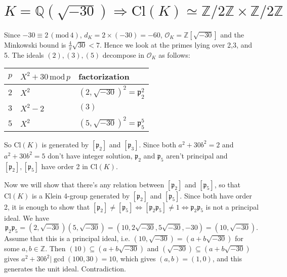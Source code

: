 \documentclass{article}
\newcommand{\Cl}{\mathrm{Cl}}
\newcommand{\Mod}[1]{\,(\mathrm{mod}\,#1)}
\begin{document}
\section{$K = \mathbb{Q}(\sqrt{-30}) \Rightarrow \Cl(K) \simeq \mathbb{Z}/2\mathbb{Z}\times\mathbb{Z}/2\mathbb{Z}$}
Since $-30\equiv 2\Mod{4}$, $d_{K} = 2\times (-30) = -60$, $\mathcal{O}_{K} = \mathbb{Z}[\sqrt{-30}]$ and the Minkowski bound is $\frac{4}{\pi}\sqrt{30} < 7$. Hence we look at the primes lying over 2,3, and 5. The ideals $(2), (3), (5)$ decompose in $\mathcal{O}_{K}$ as follows:
\begin{center}
\begin{tabular}{|l|l|l|}
\hline
$p$ & $X^{2} + 30 \,\mathrm{mod}\, p$ & factorization        \\ \hline
2   & $X^{2}$                         & $(2,\sqrt{-30})^{2} = \mathfrak{p}_{2}^{2}$ \\ \hline
3   & $X^2 - 2$                       & $(3)$                \\ \hline
5   & $X^{2}$                         & $(5,\sqrt{-30})^{2} = \mathfrak{p}_{5}^{5}$ \\ \hline
\end{tabular}
\end{center}
So $\Cl(K)$ is generated by $[\mathfrak{p}_{2}]$ and $[\mathfrak{p}_{3}]$. Since both $a^{2} + 30b^{2} = 2$ and $a^{2}+30b^{2} = 5$ don't have integer solution, $\mathfrak{p}_{2}$ and $\mathfrak{p}_{5}$ aren't principal and $[\mathfrak{p}_{2}],[\mathfrak{p}_{5}]$ have order 2 in $\Cl(K)$. 

Now we will show that there's any relation between $[\mathfrak{p}_{2}]$ and $[\mathfrak{p}_{5}]$, so that $\Cl(K)$ is a Klein 4-group generated by $[\mathfrak{p}_{2}]$ and $[\mathfrak{p}_{5}]$. Since both have order 2, it is enough to show that $[\mathfrak{p}_{2}]\neq [\mathfrak{p}_{5}] \Leftrightarrow [\mathfrak{p}_{2}\mathfrak{p}_{5}] \neq 1 \Leftrightarrow \mathfrak{p}_{2}\mathfrak{p}_{5}$ is not a principal ideal. 
We have
$$
\mathfrak{p}_{2}\mathfrak{p}_{5} = (2, \sqrt{-30})(5, \sqrt{-30}) = (10, 2\sqrt{-30}, 5\sqrt{-30}, -30) = (10, \sqrt{-30}). 
$$
Assume that this is a principal ideal, i.e. $(10, \sqrt{-30}) = (a+b\sqrt{-30})$ for some $a, b\in \mathbb{Z}$. 
Then $(10)\subseteq (a+b\sqrt{-30})$ and $(\sqrt{-30})\subseteq(a+b\sqrt{-30})$ gives $a^{2}+30b^{2} | \gcd(100, 30) = 10$, which gives $(a, b) = (1, 0)$, and this generates the unit ideal. Contradiction. 
\end{document}
